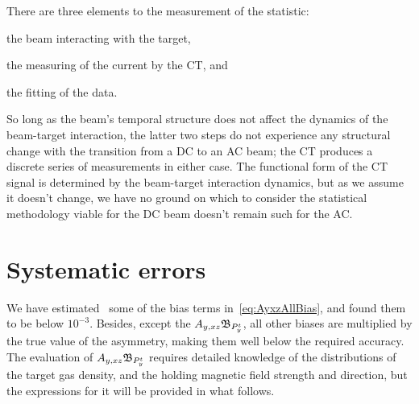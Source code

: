 \documentclass{article}
\newcommand{\bias}[1]{\mathfrak{B}_{#1}}
\begin{document}
There are three elements to the measurement of the statistic: \begin{inparaenum}[1)]
	\item the beam interacting with the target,
	\item the measuring of the current by the CT, and
	\item the fitting of the data.
\end{inparaenum} 
So long as the beam's temporal structure does not affect the dynamics of the beam-target interaction, the latter two steps do not experience any structural change with the transition from a DC to an AC beam; the CT produces a discrete series of measurements in either case. The functional form of the CT signal is determined by the beam-target interaction dynamics, but as we assume it doesn't change, we have no ground on which to consider the statistical methodology viable for the DC beam doesn't remain such for the AC.
 
\section{Systematic errors}

We have estimated~\cite{Diploma} some of the bias terms in~\eqref{eq:AyxzAllBias}, and found them to be below $10^{-3}$. Besides, except the $\Ayxz\bias{P^t_y}$, all other biases are multiplied by the true value of the asymmetry, making them well below the required accuracy. The evaluation of $\Ayxz\bias{P^t_y}$ requires detailed knowledge of the distributions of the target gas density, and the holding magnetic field strength and direction, but the expressions for it will be provided in what follows.

%
%
%
\end{document}
